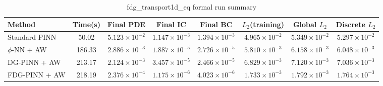 \begin{table}[h]
\centering
\caption{fdg_transport1d_eq formal run summary}
\begin{adjustbox}{max width=\textwidth}
\scriptsize
\begin{tabular}{lccccccc}
\toprule
Method & Time(s) & Final PDE & Final IC & Final BC & $L_2$(training) & Global $L_2$ & Discrete $L_2$ \\
\midrule
Standard PINN & 50.02 & $5.123\times10^{-2}$ & $1.147\times10^{-3}$ & $1.394\times10^{-3}$ & $4.965\times10^{-2}$ & $5.349\times10^{-2}$ & $5.297\times10^{-2}$ \\
$\phi$-NN + AW & 186.33 & $2.886\times10^{-3}$ & $1.887\times10^{-5}$ & $2.726\times10^{-5}$ & $5.810\times10^{-3}$ & $6.158\times10^{-3}$ & $6.048\times10^{-3}$ \\
DG-PINN + AW & 213.17 & $2.124\times10^{-3}$ & $3.457\times10^{-5}$ & $2.466\times10^{-5}$ & $6.829\times10^{-3}$ & $7.120\times10^{-3}$ & $7.036\times10^{-3}$ \\
FDG-PINN + AW & 218.19 & $2.376\times10^{-4}$ & $1.175\times10^{-6}$ & $4.023\times10^{-6}$ & $1.733\times10^{-3}$ & $1.792\times10^{-3}$ & $1.764\times10^{-3}$ \\
\bottomrule
\end{tabular}
\end{adjustbox}
\end{table}
